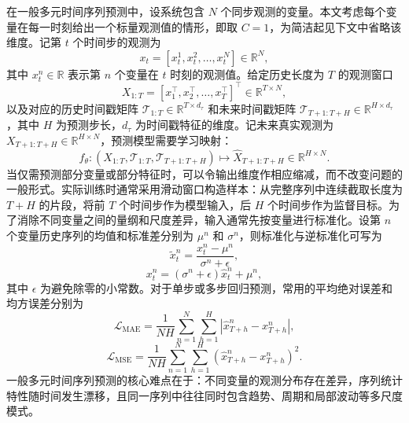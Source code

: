 在一般多元时间序列预测中，设系统包含 $N$ 个同步观测的变量。本文考虑每个变量在每一时刻给出一个标量观测值的情形，即取 $C=1$，为简洁起见下文中省略该维度。记第 $t$ 个时间步的观测为
\begin{equation}
x_t = \left[x_{t}^{1}, x_{t}^{2}, \ldots, x_{t}^{N}\right] \in \mathbb{R}^{N},
\end{equation}
其中 $x_{t}^{n} \in \mathbb{R}$ 表示第 $n$ 个变量在 $t$ 时刻的观测值。给定历史长度为 $T$ 的观测窗口
\begin{equation}
X_{1:T} = \left[x_{1}^{\top}, x_{2}^{\top}, \ldots, x_{T}^{\top}\right]^{\top} \in \mathbb{R}^{T \times N},
\end{equation}
以及对应的历史时间戳矩阵 $\mathcal{T}_{1:T} \in \mathbb{R}^{T \times d_{\tau}}$ 和未来时间戳矩阵 $\mathcal{T}_{T+1:T+H} \in \mathbb{R}^{H \times d_{\tau}}$，其中 $H$ 为预测步长，$d_{\tau}$ 为时间戳特征的维度。记未来真实观测为 $X_{T+1:T+H} \in \mathbb{R}^{H \times N}$，预测模型需要学习映射：
\begin{equation}
f_{\theta}: \left(X_{1:T}, \mathcal{T}_{1:T}, \mathcal{T}_{T+1:T+H}\right) \mapsto \hat{X}_{T+1:T+H} \in \mathbb{R}^{H \times N}.
\end{equation}
当仅需预测部分变量或部分特征时，可以令输出维度作相应缩减，而不改变问题的一般形式。实际训练时通常采用滑动窗口构造样本：从完整序列中连续截取长度为 $T+H$ 的片段，将前 $T$ 个时间步作为模型输入，后 $H$ 个时间步作为监督目标。为了消除不同变量之间的量纲和尺度差异，输入通常先按变量进行标准化。设第 $n$ 个变量历史序列的均值和标准差分别为 $\mu^{n}$ 和 $\sigma^{n}$，则标准化与逆标准化可写为
\begin{equation}
    \tilde{x}_{t}^{n} = \frac{x_{t}^{n} - \mu^{n}}{\sigma^{n} + \epsilon},
\end{equation}
\begin{equation}
    x_{t}^{n} = \left(\sigma^{n} + \epsilon\right) \hat{x}_{t}^{n} + \mu^{n},
\end{equation}
其中 $\epsilon$ 为避免除零的小常数。对于单步或多步回归预测，常用的平均绝对误差和均方误差分别为
\begin{equation}
    \mathcal{L}_{\mathrm{MAE}} = \frac{1}{NH} \sum_{n=1}^{N} \sum_{h=1}^{H}
    \left| \hat{x}_{T+h}^{n} - x_{T+h}^{n} \right|,
\end{equation}
\begin{equation}
    \mathcal{L}_{\mathrm{MSE}} = \frac{1}{NH} \sum_{n=1}^{N} \sum_{h=1}^{H}
    \left( \hat{x}_{T+h}^{n} - x_{T+h}^{n} \right)^{2}.
\end{equation}
一般多元时间序列预测的核心难点在于：不同变量的观测分布存在差异，序列统计特性随时间发生漂移，且同一序列中往往同时包含趋势、周期和局部波动等多尺度模式。

